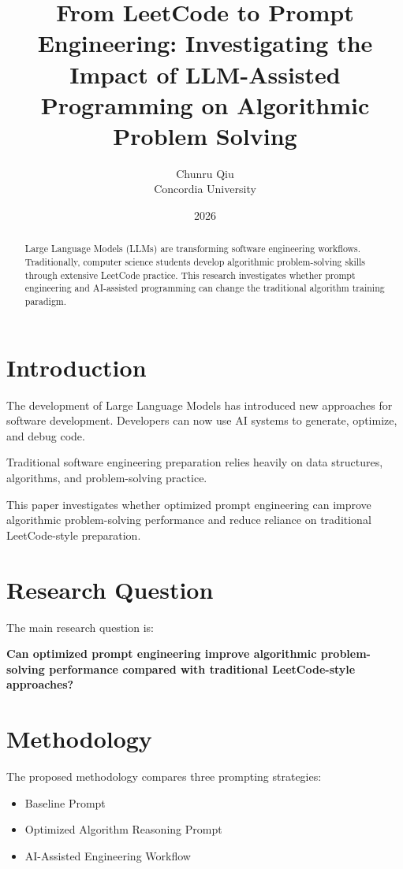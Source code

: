 \documentclass[11pt]{article}
\title{
From LeetCode to Prompt Engineering:
Investigating the Impact of LLM-Assisted Programming on Algorithmic Problem Solving
}
\author{
Chunru Qiu\\
Concordia University
}
\date{2026}
\begin{document}
\maketitle


\begin{abstract}

Large Language Models (LLMs) are transforming software engineering workflows.
Traditionally, computer science students develop algorithmic problem-solving
skills through extensive LeetCode practice. This research investigates whether
prompt engineering and AI-assisted programming can change the traditional
algorithm training paradigm.

\end{abstract}


\section{Introduction}

The development of Large Language Models has introduced new approaches
for software development. Developers can now use AI systems to generate,
optimize, and debug code.

Traditional software engineering preparation relies heavily on data structures,
algorithms, and problem-solving practice.

This paper investigates whether optimized prompt engineering can improve
algorithmic problem-solving performance and reduce reliance on traditional
LeetCode-style preparation.


\section{Research Question}

The main research question is:

\textbf{
Can optimized prompt engineering improve algorithmic problem-solving
performance compared with traditional LeetCode-style approaches?
}


\section{Methodology}

The proposed methodology compares three prompting strategies:

\begin{itemize}
    \item Baseline Prompt
    \item Optimized Algorithm Reasoning Prompt
    \item AI-Assisted Engineering Workflow
\end{itemize}
\end{document}
